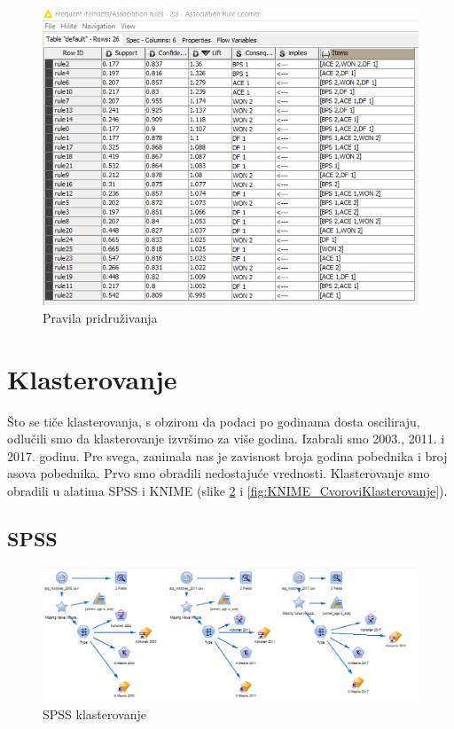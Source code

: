 \documentclass[a4paper]{article}
\begin{document}
\begin{figure}[h!]
	\begin{center}
		\includegraphics[scale=0.6]{KNIME_project/PravilaPridruzivanja/rule_learner_2009}
	\end{center}
	\caption{Pravila pridruživanja}
	\label{fig:rule_learner}
\end{figure}

\section{Klasterovanje}

Što se tiče klasterovanja, s obzirom da podaci po godinama dosta osciliraju, odlučili smo da klasterovanje izvršimo za više godina. Izabrali smo 2003., 2011. i 2017. godinu. Pre svega, zanimala nas je zavisnost broja godina pobednika i broj asova pobednika. Prvo smo obradili nedostajuće vrednosti. Klasterovanje smo obradili u alatima SPSS i KNIME (slike \ref{fig:SPSS_CvoroviKlasterovanje} i \ref{fig:KNIME_CvoroviKlasterovanje}). 

\subsection{SPSS}

\begin{figure}[H]
	\begin{center}
		\includegraphics[scale=0.60]{Klasterovanje/SPSS_Cvorovi.png}
	\end{center}
	\caption{SPSS klasterovanje}
	\label{fig:SPSS_CvoroviKlasterovanje}
\end{figure}
\end{document}

